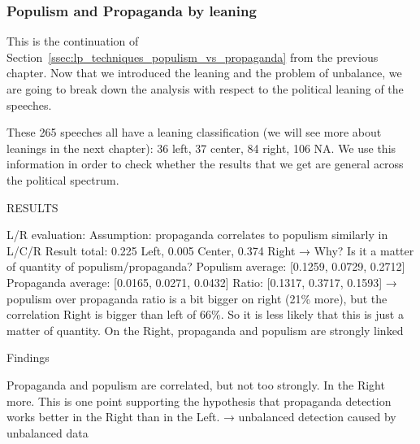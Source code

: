 \subsubsection{Populism and Propaganda by leaning}

This is the continuation of Section~\ref{ssec:lp_techniques_populism_vs_propaganda} from the previous chapter. Now that we introduced the leaning and the problem of unbalance, we are going to break down the analysis with respect to the political leaning of the speeches.

These 265 speeches all have a leaning classification (we will see more about leanings in the next chapter): 36 left, 37 center, 84 right, 106 NA. We use this information in order to check whether the results that we get are general across the political spectrum.

RESULTS

L/R evaluation:
Assumption: propaganda correlates to populism similarly in L/C/R
Result total: 0.225 Left, 0.005 Center, 0.374 Right → Why? Is it a matter of quantity of populism/propaganda?
Populism average:  [0.1259, 0.0729, 0.2712]
Propaganda average: [0.0165, 0.0271, 0.0432]
Ratio: [0.1317, 0.3717, 0.1593] → populism over propaganda ratio is a bit bigger on right (21\% more), but the correlation Right is bigger than left of 66\%. So it is less likely that this is just a matter of quantity. On the Right, propaganda and populism are strongly linked

Findings

Propaganda and populism are correlated, but not too strongly. In the Right more. This is one point supporting the hypothesis that propaganda detection works better in the Right than in the Left. → unbalanced detection caused by unbalanced data